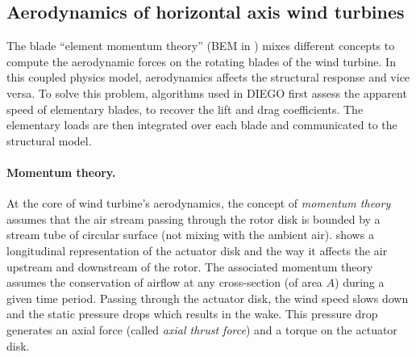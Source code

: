\subsection{Aerodynamics of horizontal axis wind turbines}

The blade ``element momentum theory'' (BEM in ) mixes different concepts to compute the aerodynamic forces on the rotating blades of the wind turbine. 
In this coupled physics model, aerodynamics affects the structural response and vice versa. 
To solve this problem, algorithms used in DIEGO first assess the apparent speed of elementary blades, to recover the lift and drag coefficients. 
The elementary loads are then integrated over each blade and communicated to the structural model.


\paragraph{Momentum theory.}
At the core of wind turbine's aerodynamics, the concept of \textit{momentum theory} assumes that the air stream passing through the rotor disk is bounded by a stream tube of circular surface (not mixing with the ambient air). 
 shows a longitudinal representation of the actuator disk and the way it affects the air upstream and downstream of the rotor. 
The associated momentum theory assumes the conservation of airflow at any cross-section (of area $A$) during a given time period. 
Passing through the actuator disk, the wind speed slows down and the static pressure drops which results in the wake. 
This pressure drop generates an axial force (called \textit{axial thrust force}) and a torque on the actuator disk.

